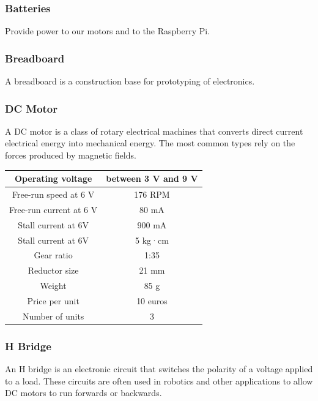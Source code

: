 \subsubsection{Batteries}
Provide power to our motors and to the Raspberry Pi.
\subsubsection{Breadboard}
A breadboard is a construction base for prototyping of electronics.
\subsubsection{DC Motor}
A DC motor is a class of rotary electrical machines that converts
direct current electrical energy into mechanical energy. The most common
types rely on the forces produced by magnetic fields.
\begin{center}
    \begin{tabular}{ |c|c| }
        \hline
        Operating voltage       & between 3 V and 9 V \\
        \hline
        Free-run speed at 6 V   & 176 RPM             \\
        \hline
        Free-run current at 6 V & 80 mA               \\
        \hline
        Stall current at 6V     & 900 mA              \\
        \hline
        Stall current at 6V     & 5 kg·cm             \\
        \hline
        Gear ratio              & 1:35                \\
        \hline
        Reductor size           & 21 mm               \\
        \hline
        Weight                  & 85 g                \\
        \hline
        Price per unit          & 10 euros            \\
        \hline
        Number of units         & 3                   \\
        \hline
    \end{tabular}
\end{center}

\subsubsection{H Bridge}
An H bridge is an electronic circuit that switches the polarity of a
voltage applied to a load. These circuits are often used in robotics
and other applications to allow DC motors to run forwards or backwards.
